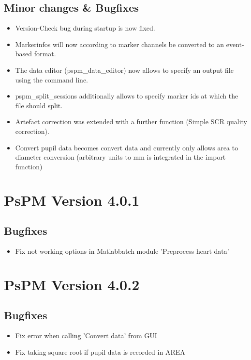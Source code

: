 \documentclass[english]{article}
\numberwithin{equation}{section}
\numberwithin{figure}{section}
\begin{document}
\subsection*{Minor changes \& Bugfixes}
\begin{itemize}
\item Version-Check bug during startup is now fixed.
\item Markerinfos will now according to marker channels be converted to
an event-based format.
\item The data editor (pspm\_data\_editor) now allows to specify an output
file using the command line.
\item pspm\_split\_sessions additionally allows to specify marker ids at
which the file should split.
\item Artefact correction was extended with a further function (Simple SCR
quality correction).
\item Convert pupil data becomes convert data and currently only allows
area to diameter conversion (arbitrary units to mm is integrated in
the import function)
\end{itemize}

\section{PsPM Version 4.0.1}

\subsection*{Bugfixes}
\begin{itemize}
\item Fix not working options in Matlabbatch module 'Preprocess heart data'
\end{itemize}

\section{PsPM Version 4.0.2}

\subsection*{Bugfixes}
\begin{itemize}
\item Fix error when calling 'Convert data' from GUI
\item Fix taking square root if pupil data is recorded in AREA
\end{itemize}
\end{document}

